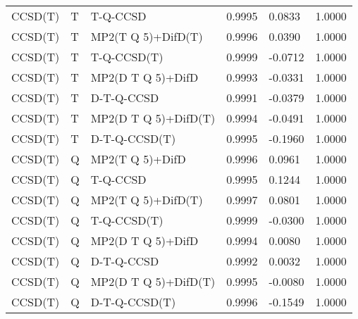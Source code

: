 \begin{table}
\begin{tabular}{l l l l l l }
    CCSD(T) & T & T-Q-CCSD & 0.9995 & 0.0833 & 1.0000 \\ 
    CCSD(T) & T & MP2(T Q 5)+DifD(T) & 0.9996 & 0.0390 & 1.0000 \\ 
    CCSD(T) & T & T-Q-CCSD(T) & 0.9999 & -0.0712 & 1.0000 \\ 
    CCSD(T) & T & MP2(D T Q 5)+DifD & 0.9993 & -0.0331 & 1.0000 \\ 
    CCSD(T) & T & D-T-Q-CCSD & 0.9991 & -0.0379 & 1.0000 \\ 
    CCSD(T) & T & MP2(D T Q 5)+DifD(T) & 0.9994 & -0.0491 & 1.0000 \\ 
    CCSD(T) & T & D-T-Q-CCSD(T) & 0.9995 & -0.1960 & 1.0000 \\ 
    CCSD(T) & Q & MP2(T Q 5)+DifD & 0.9996 & 0.0961 & 1.0000 \\ 
    CCSD(T) & Q & T-Q-CCSD & 0.9995 & 0.1244 & 1.0000 \\ 
    CCSD(T) & Q & MP2(T Q 5)+DifD(T) & 0.9997 & 0.0801 & 1.0000 \\ 
    CCSD(T) & Q & T-Q-CCSD(T) & 0.9999 & -0.0300 & 1.0000 \\ 
    CCSD(T) & Q & MP2(D T Q 5)+DifD & 0.9994 & 0.0080 & 1.0000 \\ 
    CCSD(T) & Q & D-T-Q-CCSD & 0.9992 & 0.0032 & 1.0000 \\ 
    CCSD(T) & Q & MP2(D T Q 5)+DifD(T) & 0.9995 & -0.0080 & 1.0000 \\ 
    CCSD(T) & Q & D-T-Q-CCSD(T) & 0.9996 & -0.1549 & 1.0000 \\ 
    \hline
  \end{tabular}
\end{table}
